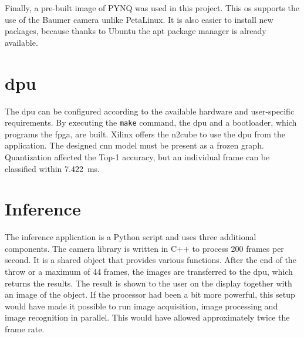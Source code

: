 Finally, a pre-built image of PYNQ was used in this project.
This \acrlong{os} supports the use of the Baumer camera unlike PetaLinux.
It is also easier to install new packages, because thanks to Ubuntu the \acrshort{apt} package manager is already available.

\section{\Acrlong{dpu}}
\label{sec:conclusion:dpu}
The \acrshort{dpu} can be configured according to the available hardware and user-specific requirements.
By executing the \texttt{make} command, the \acrshort{dpu} and a bootloader, which programs the \acrshort{fpga}, are built.
Xilinx offers the \acrshort{n2cube}  to use the \acrshort{dpu} from the application.
The designed \acrshort{cnn} model must be present as a frozen graph.
Quantization affected the Top-1 accuracy, but an individual frame can be classified within \SI{7.422}{ms}.

\section{Inference}
\label{sec:conclusion:inference}
The inference application is a Python script and uses three additional components.
The camera library is written in C++ to process 200 frames per second.
It is a shared object that provides various functions.
After the end of the throw or a maximum of 44 frames, the images are transferred to the \acrshort{dpu}, which returns the results.
The result is shown to the user on the display together with an image of the object.
If the processor had been a bit more powerful, this setup would have made it possible to run image acquisition, image processing and image recognition in parallel.
This would have allowed approximately twice the frame rate. 

